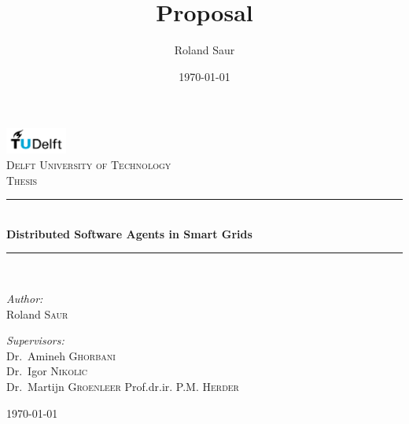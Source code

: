 \documentclass[a4paper]{article}
\title{Proposal}
\author{Roland Saur}
\date{\today}
\begin{document}
\begin{titlepage}

\begin{center}


\includegraphics[width=0.15\textwidth]{tud.png}\\[1cm]    

\textsc{\LARGE Delft University of Technology}\\[1.5cm]

\textsc{\Large Thesis}\\[0.5cm]


\newcommand{\HRule}{\rule{\linewidth}{0.5mm}}
\HRule \\[0.4cm]
{ \huge \bfseries Distributed Software Agents in Smart Grids}\\[0.4cm]

\HRule \\[1.5cm]

\begin{minipage}{0.4\textwidth}
\begin{flushleft} \large
\emph{Author:}\\
Roland \textsc{Saur}
\end{flushleft}
\end{minipage}
\hfill
\begin{minipage}{0.4\textwidth}
\begin{flushright} \large
\emph{Supervisors:} \\
Dr.~Amineh \textsc{Ghorbani} \\
Dr.~Igor \textsc{Nikolic} \\
Dr.~Martijn \textsc{Groenleer}
Prof.dr.ir. P.M. \textsc{Herder}  \\

\end{flushright}
\end{minipage}

\vfill

{\large \today}

\end{center}

\end{titlepage}
\newpage
\tableofcontents
\newpage
\listoffigures
\newpage
\end{document}
